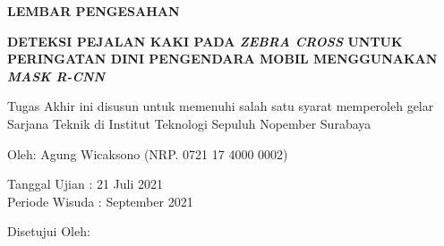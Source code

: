 \begin{center}
	\large
  \textbf{LEMBAR PENGESAHAN}
\end{center}

\thispagestyle{empty}

\begin{center}
  \textbf{DETEKSI PEJALAN KAKI PADA \textit{ZEBRA CROSS} UNTUK PERINGATAN DINI PENGENDARA MOBIL MENGGUNAKAN \textit{MASK R-CNN}}
\end{center}

\begingroup
  \small

  \begin{center}
    Tugas Akhir ini disusun untuk memenuhi salah satu syarat memperoleh gelar Sarjana Teknik di Institut Teknologi Sepuluh Nopember Surabaya
  \end{center}

  \begin{center}
    Oleh: Agung Wicaksono (NRP. 0721 17 4000 0002)
  \end{center}

  \begin{center}
    Tanggal Ujian :  21 Juli 2021\\
    Periode Wisuda : September 2021
  \end{center}

  \begin{center}
    Disetujui Oleh:
  \end{center}

  \begingroup
    \setlength{\tabcolsep}{0pt}

